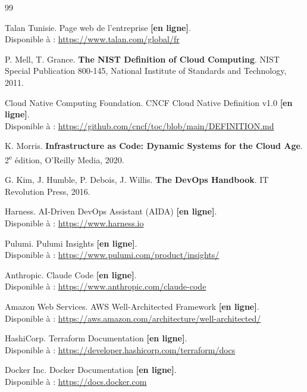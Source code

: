 
\adjustmtc
\renewcommand\bibname{WEBOGRAPHIE}

\begin{thebibliography}{99}

Talan Tunisie. Page web de l'entreprise \textbf{[en ligne]}.\\Disponible à :
\url{https://www.talan.com/global/fr}

P. Mell, T. Grance. \textbf{The NIST Definition of Cloud Computing}. NIST Special
Publication 800-145, National Institute of Standards and Technology, 2011.

Cloud Native Computing Foundation. CNCF Cloud Native Definition v1.0 \textbf{[en ligne]}.\\Disponible à : \url{https://github.com/cncf/toc/blob/main/DEFINITION.md}

K. Morris. \textbf{Infrastructure as Code: Dynamic Systems for the Cloud Age}. 2\textsuperscript{e}
édition, O'Reilly Media, 2020.

G. Kim, J. Humble, P. Debois, J. Willis. \textbf{The DevOps Handbook}. IT Revolution
Press, 2016.

Harness. AI-Driven DevOps Assistant (AIDA) \textbf{[en ligne]}.\\Disponible à :
\url{https://www.harness.io}

Pulumi. Pulumi Insights \textbf{[en ligne]}.\\Disponible à :
\url{https://www.pulumi.com/product/insights/}

Anthropic. Claude Code \textbf{[en ligne]}.\\Disponible à :
\url{https://www.anthropic.com/claude-code}

Amazon Web Services. AWS Well-Architected Framework \textbf{[en ligne]}.\\Disponible à :
\url{https://aws.amazon.com/architecture/well-architected/}

HashiCorp. Terraform Documentation \textbf{[en ligne]}.\\Disponible à :
\url{https://developer.hashicorp.com/terraform/docs}

Docker Inc. Docker Documentation \textbf{[en ligne]}.\\Disponible à :
\url{https://docs.docker.com}


\end{thebibliography}
